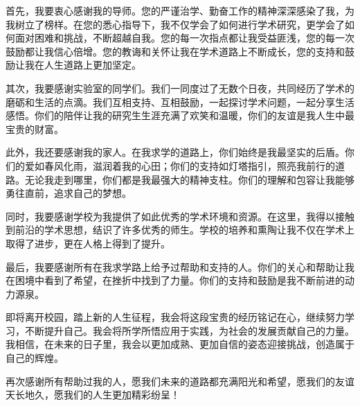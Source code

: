\begin{ack}
首先，我要衷心感谢我的导师。您的严谨治学、勤奋工作的精神深深感染了我，为我树立了榜样。在您的悉心指导下，我不仅学会了如何进行学术研究，更学会了如何面对困难和挑战，不断超越自我。您的每一次指点都让我受益匪浅，您的每一次鼓励都让我信心倍增。您的教诲和关怀让我在学术道路上不断成长，您的支持和鼓励让我在人生道路上更加坚定。

其次，我要感谢实验室的同学们。我们一同度过了无数个日夜，共同经历了学术的磨砺和生活的点滴。我们互相支持、互相鼓励，一起探讨学术问题，一起分享生活感悟。你们的陪伴让我的研究生生涯充满了欢笑和温暖，你们的友谊是我人生中最宝贵的财富。

此外，我还要感谢我的家人。在我求学的道路上，你们始终是我最坚实的后盾。你们的爱如春风化雨，滋润着我的心田；你们的支持如灯塔指引，照亮我前行的道路。无论我走到哪里，你们都是我最强大的精神支柱。你们的理解和包容让我能够勇往直前，追求自己的梦想。

同时，我要感谢学校为我提供了如此优秀的学术环境和资源。在这里，我得以接触到前沿的学术思想，结识了许多优秀的师生。学校的培养和熏陶让我不仅在学术上取得了进步，更在人格上得到了提升。

最后，我要感谢所有在我求学路上给予过帮助和支持的人。你们的关心和帮助让我在困境中看到了希望，在挫折中找到了力量。你们的支持和鼓励是我不断前进的动力源泉。

即将离开校园，踏上新的人生征程，我会将这段宝贵的经历铭记在心，继续努力学习，不断提升自己。我会将所学所悟应用于实践，为社会的发展贡献自己的力量。我相信，在未来的日子里，我会以更加成熟、更加自信的姿态迎接挑战，创造属于自己的辉煌。

再次感谢所有帮助过我的人，愿我们未来的道路都充满阳光和希望，愿我们的友谊天长地久，愿我们的人生更加精彩纷呈！

\end{ack}
